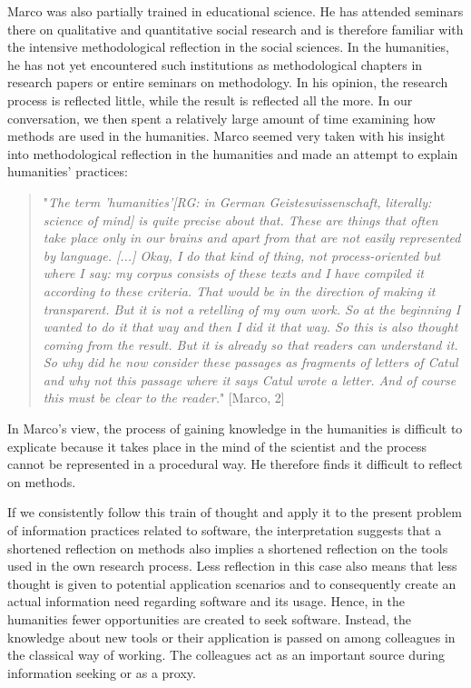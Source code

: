 \documentclass[12pt, a4paper, titlepage, oneside, abstract=true, toc=listof, toc=bibliography, BCOR=1cm]{scrreprt}
\begin{document}
{Marco was also partially trained in educational science. He has attended seminars there on qualitative and quantitative social research and is therefore familiar with the intensive methodological reflection in the social sciences. In the humanities, he has not yet encountered such institutions as methodological chapters in research papers or entire seminars on methodology. In his opinion, the research process is reflected little, while the result is reflected all the more. In our conversation, we then spent a relatively large amount of time examining how methods are used in the humanities. Marco seemed very taken with his insight into methodological reflection in the humanities and made an attempt to explain humanities' practices:

\begin{quotation}
"\textit{The term 'humanities'[RG: in German Geisteswissenschaft, literally: science of mind] is quite precise about that. These are things that often take place only in our brains and apart from that are not easily represented by language. [...] Okay, I do that kind of thing, not process-oriented but where I say: my corpus consists of these texts and I have compiled it according to these criteria. That would be in the direction of making it transparent. But it is not a retelling of my own work. So at the beginning I wanted to do it that way and then I did it that way. So this is also thought coming from the result. But it is already so that readers can understand it. So why did he now consider these passages as fragments of letters of Catul and why not this passage where it says Catul wrote a letter. And of course this must be clear to the reader.}" [Marco, 2]
\end{quotation}

In Marco's view, the process of gaining knowledge in the humanities is difficult to explicate because it takes place in the mind of the scientist and the process cannot be represented in a procedural way. He therefore finds it difficult to reflect on methods.

If we consistently follow this train of thought and apply it to the present problem of information practices related to software, the interpretation suggests that a shortened reflection on methods also implies a shortened reflection on the tools used in the own research process. Less reflection in this case also means that less thought is given to potential application scenarios and to consequently create an actual information need regarding software and its usage. Hence, in the humanities fewer opportunities are created to seek software. Instead, the knowledge about new tools or their application is passed on among colleagues in the classical way of working. The colleagues act as an important source during information seeking or as a proxy. 

}
\end{document}
